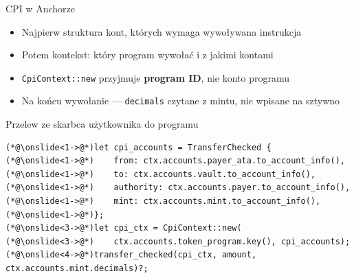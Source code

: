 \begin{frame}[fragile]{CPI w Anchorze}
  \begin{itemize}
    \item Najpierw struktura kont, których wymaga wywoływana instrukcja
    \item Potem kontekst: który program wywołać i z jakimi kontami
    \item \texttt{CpiContext::new} przyjmuje \textbf{program ID}, nie konto programu
    \item Na końcu wywołanie --- \texttt{decimals} czytane z mintu, nie wpisane na sztywno
  \end{itemize}
  \begin{codeblock}{Przelew ze skarbca użytkownika do programu}
\begin{lstlisting}[style=reveal]
(*@\onslide<1->@*)let cpi_accounts = TransferChecked {
(*@\onslide<1->@*)    from: ctx.accounts.payer_ata.to_account_info(),
(*@\onslide<1->@*)    to: ctx.accounts.vault.to_account_info(),
(*@\onslide<1->@*)    authority: ctx.accounts.payer.to_account_info(),
(*@\onslide<1->@*)    mint: ctx.accounts.mint.to_account_info(),
(*@\onslide<1->@*)};
(*@\onslide<3->@*)let cpi_ctx = CpiContext::new(
(*@\onslide<3->@*)    ctx.accounts.token_program.key(), cpi_accounts);
(*@\onslide<4->@*)transfer_checked(cpi_ctx, amount, ctx.accounts.mint.decimals)?;
\end{lstlisting}
  \end{codeblock}
\end{frame}

